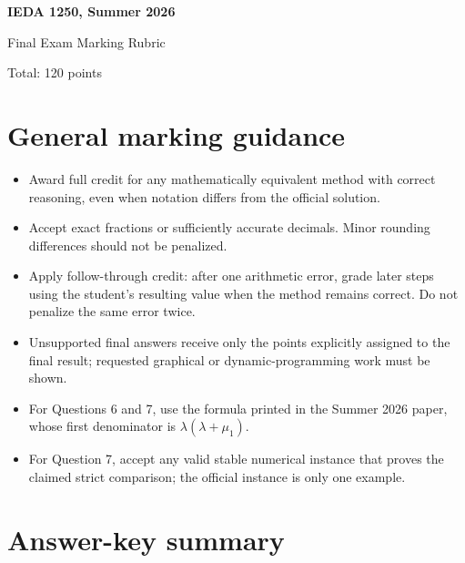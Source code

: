 \documentclass[11pt,letterpaper]{article}
\begin{document}
\begin{center}
  {\LARGE\bfseries IEDA 1250, Summer 2026}\par
  \vspace{0.2em}
  {\Large Final Exam Marking Rubric}\par
  \vspace{0.4em}
  {\normalsize Total: 120 points}
\end{center}

\section*{General marking guidance}

\begin{itemize}
  \item Award full credit for any mathematically equivalent method with correct
  reasoning, even when notation differs from the official solution.
  \item Accept exact fractions or sufficiently accurate decimals.  Minor rounding
  differences should not be penalized.
  \item Apply follow-through credit: after one arithmetic error, grade later steps
  using the student's resulting value when the method remains correct.  Do not
  penalize the same error twice.
  \item Unsupported final answers receive only the points explicitly assigned to the
  final result; requested graphical or dynamic-programming work must be shown.
  \item For Questions 6 and 7, use the formula printed in the Summer 2026 paper,
  whose first denominator is $\lambda(\lambda+\mu_1)$.
  \item For Question 7, accept any valid stable numerical instance that proves the
  claimed strict comparison; the official instance is only one example.
\end{itemize}

\section*{Answer-key summary}
\end{document}
